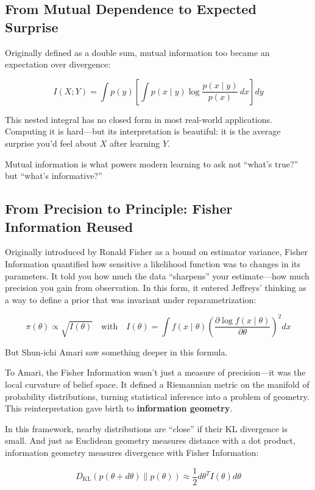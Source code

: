 \subsection{From Mutual Dependence to Expected Surprise}

Originally defined as a double sum, mutual information too became an expectation over divergence:

\[
I(X; Y) = \int p(y) \left[ \int p(x \mid y) \log \frac{p(x \mid y)}{p(x)} \, dx \right] dy
\]

This nested integral has no closed form in most real-world applications. Computing it is hard—but its interpretation is beautiful: it is the average surprise you’d feel about \( X \) after learning \( Y \).

Mutual information is what powers modern learning to ask not “what’s true?” but “what’s informative?”

\subsection{From Precision to Principle: Fisher Information Reused}

Originally introduced by Ronald Fisher as a bound on estimator variance, Fisher Information quantified how sensitive a likelihood function was to changes in its parameters. It told you how much the data “sharpens” your estimate—how much precision you gain from observation. In this form, it entered Jeffreys’ thinking as a way to define a prior that was invariant under reparametrization:

\[
\pi(\theta) \propto \sqrt{I(\theta)} \quad \text{with} \quad I(\theta) = \int f(x \mid \theta) \left( \frac{\partial \log f(x \mid \theta)}{\partial \theta} \right)^2 dx
\]

But Shun-ichi Amari saw something deeper in this formula.

To Amari, the Fisher Information wasn’t just a measure of precision—it was the local curvature of belief space. It defined a Riemannian metric on the manifold of probability distributions, turning statistical inference into a problem of geometry. This reinterpretation gave birth to \textbf{information geometry}.

In this framework, nearby distributions are “close” if their KL divergence is small. And just as Euclidean geometry measures distance with a dot product, information geometry measures divergence with Fisher Information:

\[
D_{\mathrm{KL}}(p(\theta + d\theta) \parallel p(\theta)) \approx \frac{1}{2} d\theta^T I(\theta) d\theta
\]

